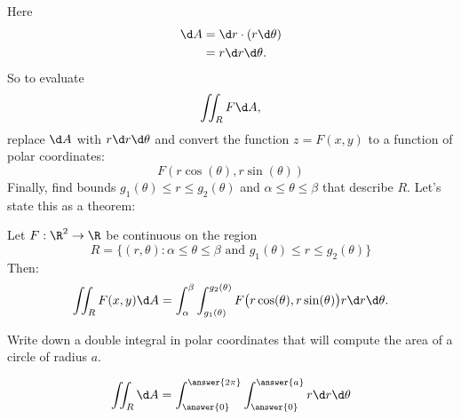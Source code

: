 \documentclass{ximera}
\begin{document}
Here
\begin{align*}
\d A &= \d r \cdot (r \d \theta) \\
&= r \d r \d \theta.
\end{align*}
So to evaluate
\[
\iint_R F\d A,
\]
replace $\d A$ with $r\d r\d\theta$ and convert the function $z=F(x,y)$
to a function of polar coordinates:
\[
F(r\cos(\theta),r\sin(\theta))
\]
Finally, find bounds $g_1(\theta)\leq r\leq g_2(\theta)$ and
$\alpha\leq\theta\leq\beta$ that describe $R$. Let's state this as a
theorem:

\begin{theorem}
  Let $F:\R^2\to\R$ be continuous on the region
  \[
  R=\{(r,\theta):\text{$\alpha\leq\theta\leq\beta$ and $g_1(\theta)\leq r\leq g_2(\theta)$}\}
  \]
  Then: 
  \[
  \iint_R F(x,y)\d A = \int_\alpha^\beta\int_{g_1(\theta)}^{g_2(\theta)} F\big(r\cos(\theta),r\sin(\theta)\big) r\d r\d \theta.
  \]
\end{theorem}

\begin{question}
  Write down a double integral in polar coordinates that will compute
  the area of a circle of radius $a$.
  \begin{prompt}
  \[
  \iint_R \d A = \int_{\answer{0}}^{\answer{2\pi}}
  \int_{\answer{0}}^{\answer{a}}r \d r \d \theta 
  \]
  \end{prompt}
\end{question}



\end{document}
